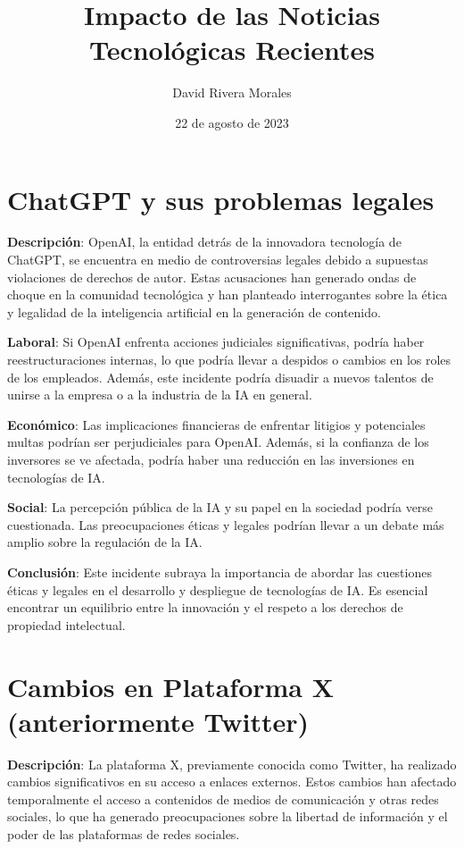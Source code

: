 \documentclass{article}
\begin{document}
\title{Impacto de las Noticias Tecnológicas Recientes}
\author{David Rivera Morales}
\date{22 de agosto de 2023}
\maketitle

\section*{ChatGPT y sus problemas legales}

\textbf{Descripción}: OpenAI, la entidad detrás de la innovadora tecnología de ChatGPT, se encuentra en medio de controversias legales debido a supuestas violaciones de derechos de autor. Estas acusaciones han generado ondas de choque en la comunidad tecnológica y han planteado interrogantes sobre la ética y legalidad de la inteligencia artificial en la generación de contenido.

\textbf{Laboral}: Si OpenAI enfrenta acciones judiciales significativas, podría haber reestructuraciones internas, lo que podría llevar a despidos o cambios en los roles de los empleados. Además, este incidente podría disuadir a nuevos talentos de unirse a la empresa o a la industria de la IA en general.

\textbf{Económico}: Las implicaciones financieras de enfrentar litigios y potenciales multas podrían ser perjudiciales para OpenAI. Además, si la confianza de los inversores se ve afectada, podría haber una reducción en las inversiones en tecnologías de IA.

\textbf{Social}: La percepción pública de la IA y su papel en la sociedad podría verse cuestionada. Las preocupaciones éticas y legales podrían llevar a un debate más amplio sobre la regulación de la IA.

\textbf{Conclusión}: Este incidente subraya la importancia de abordar las cuestiones éticas y legales en el desarrollo y despliegue de tecnologías de IA. Es esencial encontrar un equilibrio entre la innovación y el respeto a los derechos de propiedad intelectual.

\section*{Cambios en Plataforma X (anteriormente Twitter)}

\textbf{Descripción}: La plataforma X, previamente conocida como Twitter, ha realizado cambios significativos en su acceso a enlaces externos. Estos cambios han afectado temporalmente el acceso a contenidos de medios de comunicación y otras redes sociales, lo que ha generado preocupaciones sobre la libertad de información y el poder de las plataformas de redes sociales.
\end{document}
